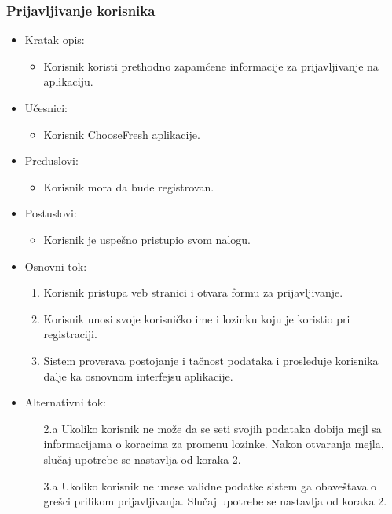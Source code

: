 \subsubsection{Prijavljivanje korisnika}

\begin{itemize}
    \item Kratak opis:
        \begin{itemize}
            \item Korisnik koristi prethodno zapamćene informacije za prijavljivanje na aplikaciju.
        \end{itemize}
    \item Učesnici:
        \begin{itemize}
            \item Korisnik ChooseFresh aplikacije.
        \end{itemize}
    \item Preduslovi:
        \begin{itemize}
            \item Korisnik mora da bude registrovan.
        \end{itemize}
    \item Postuslovi:
        \begin{itemize}
            \item Korisnik je uspešno pristupio svom nalogu.
        \end{itemize}
    \item Osnovni tok:
        \begin{enumerate}
            \item Korisnik pristupa veb stranici i otvara formu za prijavljivanje.
            \item Korisnik unosi svoje korisničko ime i lozinku koju je koristio pri registraciji.
            \item Sistem proverava postojanje i tačnost podataka i prosleđuje korisnika dalje ka osnovnom interfejsu aplikacije.
        \end{enumerate}
    \item Alternativni tok:
        \begin{itemize}
            \item[2.a] Ukoliko korisnik ne može da se seti svojih podataka dobija mejl sa informacijama o koracima za promenu lozinke. Nakon otvaranja mejla, slučaj upotrebe se nastavlja od koraka 2.
			\item[3.a] Ukoliko korisnik ne unese validne podatke sistem ga obaveštava o grešci prilikom prijavljivanja. Slučaj upotrebe se nastavlja od koraka 2.

\end{itemize}
\end{itemize}
